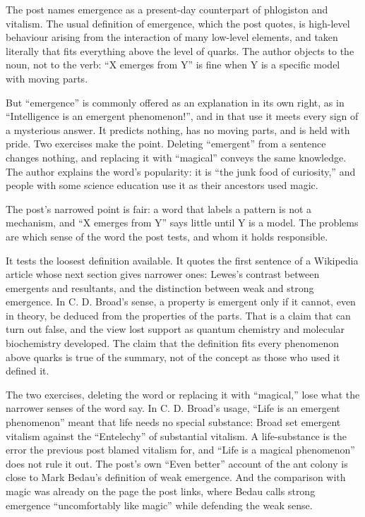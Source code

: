\begin{afterword}
\summaryhead

The post names emergence as a present-day counterpart of phlogiston and vitalism. The usual definition of emergence, which the post quotes, is high-level behaviour arising from the interaction of many low-level elements, and taken literally that fits everything above the level of quarks. The author objects to the noun, not to the verb: ``X emerges from Y'' is fine when Y is a specific model with moving parts.

But ``emergence'' is commonly offered as an explanation in its own right, as in ``Intelligence is an emergent phenomenon!'', and in that use it meets every sign of a mysterious answer. It predicts nothing, has no moving parts, and is held with pride. Two exercises make the point. Deleting ``emergent'' from a sentence changes nothing, and replacing it with ``magical'' conveys the same knowledge. The author explains the word's popularity: it is ``the junk food of curiosity,'' and people with some science education use it as their ancestors used magic.

\responsehead

The post's narrowed point is fair: a word that labels a pattern is not a mechanism, and ``X emerges from Y'' says little until Y is a model. The problems are which sense of the word the post tests, and whom it holds responsible.

It tests the loosest definition available. It quotes the first sentence of a Wikipedia article whose next section gives narrower ones: Lewes's contrast between emergents and resultants, and the distinction between weak and strong emergence. In C. D. Broad's sense, a property is emergent only if it cannot, even in theory, be deduced from the properties of the parts. That is a claim that can turn out false, and the view lost support as quantum chemistry and molecular biochemistry developed. The claim that the definition fits every phenomenon above quarks is true of the summary, not of the concept as those who used it defined it.

The two exercises, deleting the word or replacing it with ``magical,'' lose what the narrower senses of the word say. In C. D. Broad's usage, ``Life is an emergent phenomenon'' meant that life needs no special substance: Broad set emergent vitalism against the ``Entelechy'' of substantial vitalism. A life-substance is the error the previous post blamed vitalism for, and ``Life is a magical phenomenon'' does not rule it out. The post's own ``Even better'' account of the ant colony is close to Mark Bedau's definition of weak emergence. And the comparison with magic was already on the page the post links, where Bedau calls strong emergence ``uncomfortably like magic'' while defending the weak sense.


\end{afterword}
